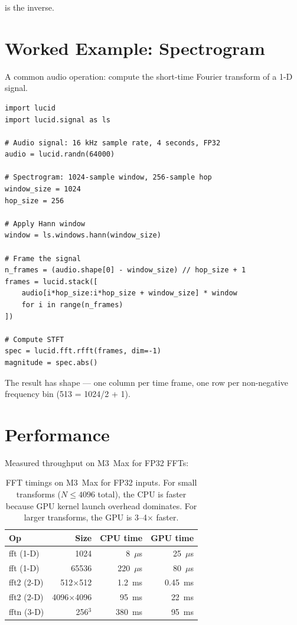  is the inverse.

\section{Worked Example: Spectrogram}
\label{sec:fft:spectrogram_example}

A common audio operation: compute the short-time Fourier
transform of a 1-D signal.

\begin{lstlisting}[style=lucid,language=LucidPython]
import lucid
import lucid.signal as ls

# Audio signal: 16 kHz sample rate, 4 seconds, FP32
audio = lucid.randn(64000)

# Spectrogram: 1024-sample window, 256-sample hop
window_size = 1024
hop_size = 256

# Apply Hann window
window = ls.windows.hann(window_size)

# Frame the signal
n_frames = (audio.shape[0] - window_size) // hop_size + 1
frames = lucid.stack([
    audio[i*hop_size:i*hop_size + window_size] * window
    for i in range(n_frames)
])

# Compute STFT
spec = lucid.fft.rfft(frames, dim=-1)
magnitude = spec.abs()
\end{lstlisting}

The result  has shape  ---
one column per time frame, one row per non-negative frequency
bin (513 = 1024/2 + 1).

\section{Performance}
\label{sec:fft:perf}

Measured throughput on M3~Max for FP32 FFTs:

\begin{table}[t]
\centering
\small
\begin{tabular}{lrrr}
\toprule
Op & Size & CPU time & GPU time \\
\midrule
fft (1-D)  & 1024       & 8~$\mu$s   & 25~$\mu$s \\
fft (1-D)  & 65536      & 220~$\mu$s & 80~$\mu$s \\
fft2 (2-D) & 512$\times$512   & 1.2~ms & 0.45~ms \\
fft2 (2-D) & 4096$\times$4096 & 95~ms  & 22~ms \\
fftn (3-D) & 256$^3$    & 380~ms & 95~ms \\
\bottomrule
\end{tabular}
\caption[FFT throughput on M3~Max.]{FFT timings on M3~Max for
FP32 inputs. For small transforms ($N \leq 4096$ total), the
CPU is faster because GPU kernel launch overhead dominates. For
larger transforms, the GPU is 3--4$\times$ faster.}
\label{tab:fft:perf}
\end{table}

